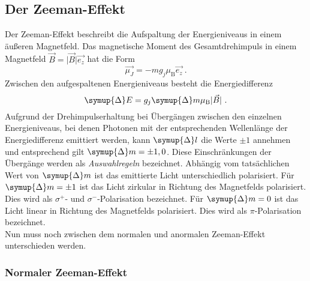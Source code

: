 \subsection{Der Zeeman-Effekt}

    Der Zeeman-Effekt beschreibt die Aufspaltung der Energieniveaus in einem äußeren Magnetfeld.
    Das magnetische Moment des Gesamtdrehimpuls in einem Magnetfeld $\vec{B} = \lvert \vec{B} \rvert \vec{e_z}$ hat die Form
    \begin{equation}
        \vec{\mu_J} = - m g_j \mu_\text{B} \vec{e_z} \ .
    \end{equation}
    Zwischen den aufgespaltenen Energieniveaus besteht die Energiedifferenz
    \begin{equation}
        \symup{\Delta} E = g_j \symup{\Delta} m \mu_\text{B} \lvert \vec{B} \rvert \ .
        \label{eqn:energiedifferenz}
    \end{equation}
    Aufgrund der Drehimpulserhaltung bei Übergängen zwischen den einzelnen Energieniveaus,
    bei denen Photonen mit der entsprechenden Wellenlänge der Energiedifferenz emittiert werden,
    kann $\symup{\Delta} l$ die Werte $\pm 1$ annehmen und entsprechend gilt $\symup{\Delta} m = \pm 1, 0$.
    Diese Einschränkungen der Übergänge werden als \textit{Auswahlregeln} bezeichnet.
    Abhängig vom tatsächlichen Wert von $\symup{\Delta} m$ ist das emittierte Licht unterschiedlich polarisiert.
    Für $\symup{\Delta} m = \pm 1$ ist das Licht zirkular in Richtung des Magnetfelds polarisiert.
    Dies wird als $\sigma^+$- und $\sigma^-$-Polarisation bezeichnet.
    Für $\symup{\Delta} m = 0$ ist das Licht linear in Richtung des Magnetfelds polarisiert.
    Dies wird als $\pi$-Polarisation bezeichnet.\\
    Nun muss noch zwischen dem normalen und anormalen Zeeman-Effekt unterschieden werden.


\subsubsection{Normaler Zeeman-Effekt}
\label{sec:theorie:zeeman:normal}

